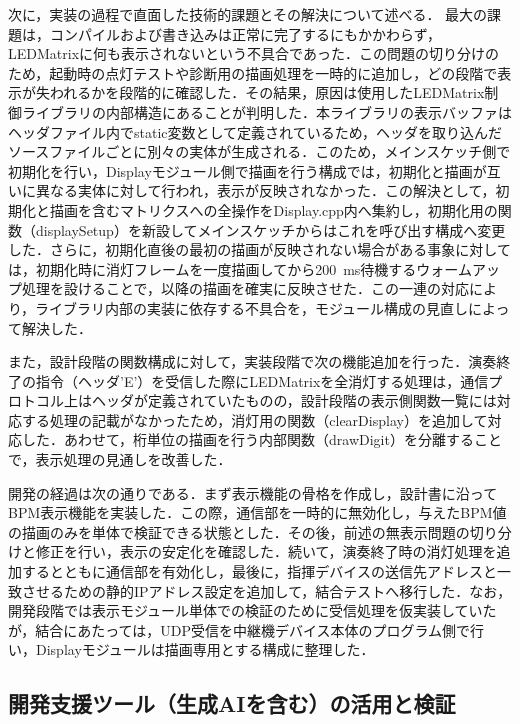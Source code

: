 次に，実装の過程で直面した技術的課題とその解決について述べる．
最大の課題は，コンパイルおよび書き込みは正常に完了するにもかかわらず，LEDMatrixに何も表示されないという不具合であった．この問題の切り分けのため，起動時の点灯テストや診断用の描画処理を一時的に追加し，どの段階で表示が失われるかを段階的に確認した．その結果，原因は使用したLEDMatrix制御ライブラリの内部構造にあることが判明した．本ライブラリの表示バッファはヘッダファイル内でstatic変数として定義されているため，ヘッダを取り込んだソースファイルごとに別々の実体が生成される．このため，メインスケッチ側で初期化を行い，Displayモジュール側で描画を行う構成では，初期化と描画が互いに異なる実体に対して行われ，表示が反映されなかった．この解決として，初期化と描画を含むマトリクスへの全操作をDisplay.cpp内へ集約し，初期化用の関数（displaySetup）を新設してメインスケッチからはこれを呼び出す構成へ変更した．さらに，初期化直後の最初の描画が反映されない場合がある事象に対しては，初期化時に消灯フレームを一度描画してから\SI{200}{ms}待機するウォームアップ処理を設けることで，以降の描画を確実に反映させた．この一連の対応により，ライブラリ内部の実装に依存する不具合を，モジュール構成の見直しによって解決した．

また，設計段階の関数構成に対して，実装段階で次の機能追加を行った．演奏終了の指令（ヘッダ'E'）を受信した際にLEDMatrixを全消灯する処理は，通信プロトコル上はヘッダが定義されていたものの，設計段階の表示側関数一覧には対応する処理の記載がなかったため，消灯用の関数（clearDisplay）を追加して対応した．あわせて，桁単位の描画を行う内部関数（drawDigit）を分離することで，表示処理の見通しを改善した．

開発の経過は次の通りである．まず表示機能の骨格を作成し，設計書に沿ってBPM表示機能を実装した．この際，通信部を一時的に無効化し，与えたBPM値の描画のみを単体で検証できる状態とした．その後，前述の無表示問題の切り分けと修正を行い，表示の安定化を確認した．続いて，演奏終了時の消灯処理を追加するとともに通信部を有効化し，最後に，指揮デバイスの送信先アドレスと一致させるための静的IPアドレス設定を追加して，結合テストへ移行した．なお，開発段階では表示モジュール単体での検証のために受信処理を仮実装していたが，結合にあたっては，UDP受信を中継機デバイス本体のプログラム側で行い，Displayモジュールは描画専用とする構成に整理した．

\FloatBarrier

\subsection{開発支援ツール（生成AIを含む）の活用と検証}
\label{sec:jissou_ai}

